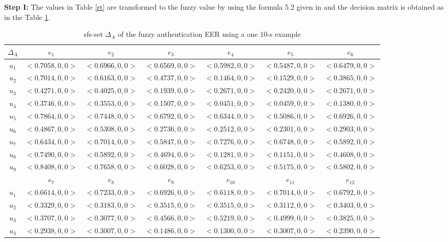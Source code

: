 \documentclass{IJFS}
\begin{document}
\textbf{Step I:} The values in Table \ref{rt} are transformed to the fuzzy value by using the formula 5.2 given in \cite{sel} and the decision matrix  is obtained as in the Table \ref{frt}.
\begin{table}[!h] \footnotesize{
\begin{center}\caption{sfs-set $\Delta_A$ of the fuzzy authentication EER using a one 10-s example\label{frt}}
\begin{tabular}{c|c c c c c c}\hline
$\Delta_A$ & $e_1$ & $e_2$ & $e_3$ &$e_4$&$e_5$ &$e_6$ \\
\hline   
$u_1$ &  $<0.7058,0,0>$ &  $<0.6966,0,0>$ & $<0.6569,0,0>$ & $<0.5982,0,0>$ &$<0.5487,0,0>$&$<0.6479,0,0>$\\
 $u_2$& $<0.7014,0,0>$   & $<0.6163,0,0>$ & $<0.4737,0,0>$ &$<0.1464,0,0>$ &$<0.1529,0,0>$ &$<0.3865,0,0>$\\ 
 $u_3$&   $<0.4271,0,0>$ & $<0.4025,0,0>$ & $<0.1939,0,0>$ &$<0.2671,0,0>$ &$<0.2420,0,0>$ &$<0.2671,0,0>$\\
 $u_4$&   $<0.3746,0,0>$  &  $<0.3553,0,0>$ & $<0.1507,0,0>$ &$<0.0451,0,0>$ &$<0.0459,0,0>$ &$<0.1380,0,0>$\\ 
 $u_5$&   $<0.7864,0,0>$ & $<0.7448,0,0>$ &  $<0.6792,0,0>$ &$<0.6344,0,0>$ &$<0.5086,0,0>$ &$<0.6926,0,0>$\\
 $u_6$&   $<0.4867,0,0>$  & $<0.5308,0,0>$ & $<0.2736,0,0>$ &$<0.2512,0,0>$ &$<0.2301,0,0>$ &$<0.2903,0,0>$\\ 
  $u_7$&  $<0.6434,0,0>$ & $<0.7014,0,0>$ & $<0.5847,0,0>$ &$<0.7276,0,0>$ &$<0.6748,0,0>$ &$<0.5892,0,0>$\\ 
  $u_8$&   $<0.7490,0,0>$ &  $<0.5892,0,0>$ & $<0.4694,0,0>$ &$<0.1281,0,0>$ &$<0.1151,0,0>$ &$<0.4608,0,0>$\\
   $u_9$&   $<0.8408,0,0>$ & $<0.7658,0,0>$ & $<0.6028,0,0>$ &$<0.6253,0,0>$ &$<0.5175,0,0>$ &$<0.5802,0,0>$\\  \hline   & $e_7$ &$e_8$ &$e_9$  &$e_{10}$&$e_{11}$ &$e_{12}$\\ \hline 
   $u_1$ &  $<0.6614,0,0>$ &  $<0.7233,0,0>$ & $<0.6926,0,0>$ & $<0.6118,0,0>$ &$<0.7014,0,0>$&$<0.6792,0,0>$\\
 $u_2$& $<0.3329,0,0>$   & $<0.3183,0,0>$ & $<0.3515,0,0>$ &$<0.3515,0,0>$ &$<0.3112,0,0>$ &$<0.3403,0,0>$\\ 
 $u_3$&   $<0.3707,0,0>$ & $<0.3077,0,0>$ & $<0.4566,0,0>$ &$<0.5219,0,0>$ &$<0.4999,0,0>$ &$<0.3825,0,0>$\\
 $u_4$&   $<0.2938,0,0>$  &  $<0.3007,0,0>$ & $<0.1486,0,0>$ &$<0.1300,0,0>$ &$<0.3007,0,0>$ &$<0.2390,0,0>$\\ 

\end{tabular}
\end{center}}
\end{table}
\end{document}

